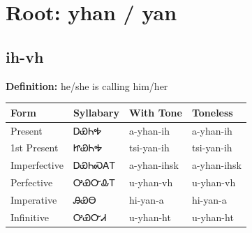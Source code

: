 \documentclass{article}%
\begin{document}
%
\normalsize%
\section*{Root: yhan / yan}%
\subsection*{ih-vh}%
\textbf{Definition: }%
he/she is calling him/her%
\\[0.5em]%
\begin{tabular}{|l|l|l|l|}%
\hline%
\textbf{Form}&\textbf{Syllabary}&\textbf{With Tone}&\textbf{Toneless}\\%
\hline%
Present&ᎠᏯᏂᎭ&a{-}yhan{-}ih&a{-}yhan{-}ih\\%
1st Present&ᏥᏯᏂᎭ&tsi{-}yan{-}ih&tsi{-}yan{-}ih\\%
Imperfective&ᎠᏯᏂᏍᎪᎢ&a{-}yhan{-}ihsk&a{-}yhan{-}ihsk\\%
Perfective&ᎤᏯᏅᎲᎢ&u{-}yhan{-}vh&u{-}yhan{-}vh\\%
Imperative&ᎯᏯᎾ&hi{-}yan{-}a&hi{-}yan{-}a\\%
Infinitive&ᎤᏯᏅᏗ&u{-}yhan{-}ht&u{-}yhan{-}ht\\%
\hline%
\end{tabular}%
\\[1em]%
\end{document}
